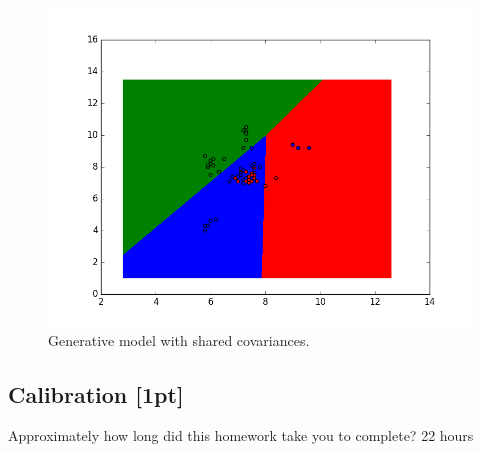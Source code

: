 \documentclass[submit]{harvardml}
\begin{document}
\begin{solution}
\begin{sol}
\begin{figure}[h!]
  \includegraphics[width=4.5in]{generative_result_shared_covariances.png}
  \caption{Generative model with shared covariances.}
\end{figure}

\end{sol}
\end{solution}


\newpage
\subsection*{Calibration [1pt]}
Approximately how long did this homework take you to complete?
22 hours
\end{document}
